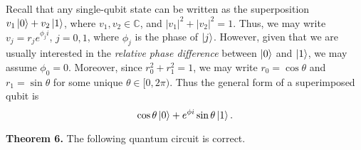 \documentclass [12pt]{article}
\theoremstyle{definition}
\begin{document}
Recall that any single-qubit state can be written as the superposition $v_1\ket{0}+v_2\ket{1}$, where $v_1,v_2\in \mathbb{C}$, and
$|v_1|^2+|v_2|^2=1$. Thus, we may write $v_j=r_je^{\phi_j i}$, $j=0,1$, where $\phi_j$ is the phase of $\ket{j}$. 
However, given that we are usually interested in the \textit{relative phase difference} between $\ket{0}$ and $\ket{1}$, we may assume $\phi_0=0$.
Moreover, since $r_0^2 + r_1^2 = 1$, we may write $r_0=\cos\theta$ and $r_1=\sin\theta$ for some unique $\theta\in[0,2\pi)$. Thus the general 
form of a superimposed qubit is
\[\cos\theta\ket{0}+e^{\phi i}\sin\theta \ket{1}.\]

\textbf{Theorem 6.} The following quantum circuit is correct.

\begin{center}
\end{center}
\end{document}
